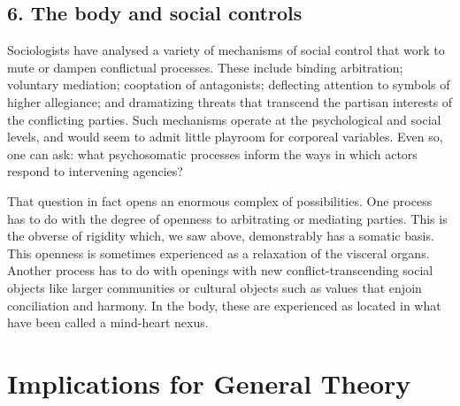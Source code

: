 \subsection*{6. The body and social controls}

Sociologists have analysed a variety of mechanisms of social control that work to mute or dampen conflictual processes. These include binding arbitration; voluntary mediation; cooptation of antagonists; deflecting attention to symbols of higher allegiance; and dramatizing threats that transcend the partisan interests of the conflicting parties. Such mechanisms operate at the psychological and social levels, and would seem to admit little playroom for corporeal variables. Even so, one can ask: what psychosomatic processes inform the ways in which actors respond to intervening agencies?

That question in fact opens an enormous complex of possibilities. One process has to do with the degree of openness to arbitrating or mediating parties. This is the obverse of rigidity which, we saw above, demonstrably has a somatic basis. This openness is sometimes experienced as a relaxation of the visceral organs. Another process has to do with openings with new conflict-transcending social objects like larger communities or cultural objects such as values that enjoin conciliation and harmony. In the body, these are experienced as located in what have been called a mind-heart nexus.

\section*{Implications for General Theory}

